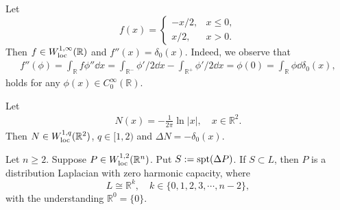 \begin{remark}
  Let 
  \begin{equation*}
    f(x) = 
    \begin{cases}
      -x/2, & x\leq 0,\\
      x/2, & x>0.
    \end{cases}
  \end{equation*}
  Then $f\in W_{\operatorname*{loc}}^{1,\infty}(\mathbb R)$ and $f''(x) = \delta_0(x)$.
  Indeed,
  we observe that 
  \begin{align*}
    f''(\phi) = \int_{\mathbb R}  f\phi''\dd x 
    = \int_{\mathbb R^-}  \phi'/2\dd x - \int_{\mathbb R^+}\phi'/2\dd x 
    = \phi(0) = \int_{\mathbb R}\phi\dd\delta_0(x),
  \end{align*}
  holds for any $\phi(x)\in C^\infty_0(\mathbb R)$.
\end{remark}

\begin{remark}
Let 
  \begin{align*}
    N(x) = -\frac{1}{2\pi}\ln|x|,\quad x\in\mathbb R^2.
  \end{align*}
Then $N\in W^{1,q}_{\operatorname*{loc}}(\mathbb R^2)$, $q\in[1,2)$ and $\Delta N = -\delta_0(x)$.
\end{remark}

\begin{proposition}
  Let $n\geq2$. 
  Suppose $P\in W_{\operatorname*{loc}}^{1,2}(\mathbb R^n)$.
  Put $S:= \operatorname*{spt}(\Delta P)$.
  If $S\subset L$, 
  then $P$ is a distribution Laplacian with zero harmonic capacity,
  where
  \[
  L\cong \mathbb{R}^k,\quad k\in\{0,1,2,3,\cdots, n-2\},
  \]
  with the understanding $\mathbb R^0=\{0\}$.
\end{proposition}


